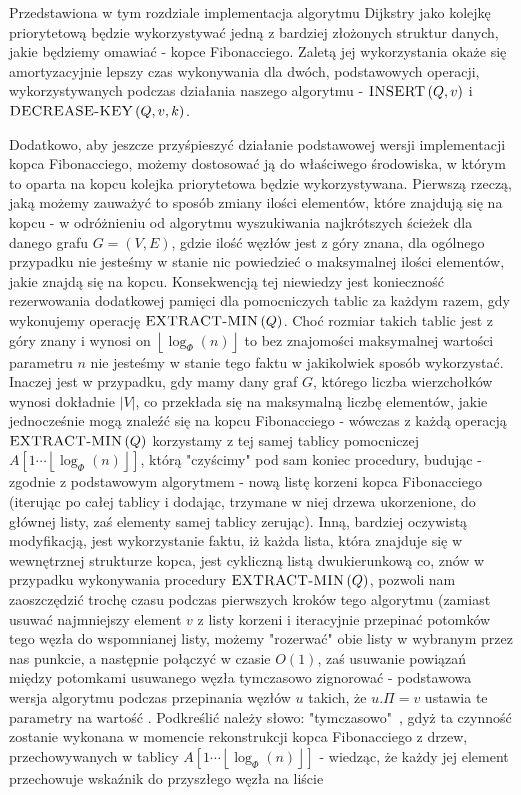 Przedstawiona w tym rozdziale implementacja algorytmu Dijkstry jako kolejkę priorytetową będzie wykorzystywać jedną z bardziej złożonych struktur danych, jakie będziemy omawiać - kopce Fibonacciego. Zaletą jej wykorzystania okaże się amortyzacyjnie lepszy czas wykonywania dla dwóch, podstawowych operacji, wykorzystywanych podczas działania naszego algorytmu - $\textrm{\textsc{INSERT}} \left( Q, v \right)$ i $\textrm{\textsc{DECREASE-KEY}} \left( Q, v, k \right)$.


Dodatkowo, aby jeszcze przyśpieszyć działanie podstawowej wersji implementacji kopca Fibonacciego, możemy dostosować ją do właściwego środowiska, w którym to oparta na kopcu kolejka priorytetowa będzie wykorzystywana. Pierwszą rzeczą, jaką możemy zauważyć to sposób zmiany ilości elementów, które znajdują się na kopcu - w odróżnieniu od algorytmu wyszukiwania najkrótszych ścieżek dla danego grafu $ G = \left( V, E \right)$, gdzie ilość węzłów jest z góry znana, dla ogólnego przypadku nie jesteśmy w stanie nic powiedzieć o maksymalnej ilości elementów, jakie znajdą się na kopcu. Konsekwencją tej niewiedzy jest konieczność rezerwowania dodatkowej pamięci dla pomocniczych tablic za każdym razem, gdy wykonujemy operację $\textrm{\textsc{EXTRACT-MIN}} \left( Q \right)$. Choć rozmiar takich tablic jest z góry znany i wynosi on $ \left \lfloor \log_{\Phi} \left( n \right) \right \rfloor $ to bez znajomości maksymalnej wartości parametru $n$ nie jesteśmy w stanie tego faktu w jakikolwiek sposób wykorzystać. Inaczej jest w przypadku, gdy mamy dany graf $G$, którego liczba wierzchołków wynosi dokładnie $ \left| V \right|$, co przekłada się na maksymalną liczbę elementów, jakie jednocześnie mogą znaleźć się na kopcu Fibonacciego - wówczas z każdą operacją $\textrm{\textsc{EXTRACT-MIN}} \left( Q \right)$ korzystamy z tej samej tablicy pomocniczej $A \left[ 1 \cdots \left \lfloor \log_{\Phi} \left( n \right) \right \rfloor \right]$, którą "czyścimy" pod sam koniec procedury, budując - zgodnie z podstawowym algorytmem - nową listę korzeni kopca Fibonacciego (iterując po całej tablicy i dodając, trzymane w niej drzewa ukorzenione, do głównej listy, zaś elementy samej tablicy zerując). Inną, bardziej oczywistą modyfikacją, jest wykorzystanie faktu, iż każda lista, która znajduje się w wewnętrznej strukturze kopca, jest cykliczną listą dwukierunkową co, znów w przypadku wykonywania procedury $\textrm{\textsc{EXTRACT-MIN}} \left( Q \right)$, pozwoli nam zaoszczędzić trochę czasu podczas pierwszych kroków tego algorytmu (zamiast usuwać najmniejszy element $v$ z listy korzeni i iteracyjnie przepinać potomków tego węzła do wspomnianej listy, możemy "rozerwać" obie listy w wybranym przez nas punkcie, a następnie połączyć w czasie $O \left( 1 \right)$, zaś usuwanie powiązań między potomkami usuwanego węzła tymczasowo zignorować - podstawowa wersja algorytmu podczas przepinania węzłów $u$ takich, że $ u.\Pi = v$ ustawia te parametry na wartość \KwNull. Podkreślić należy słowo: "tymczasowo"~, gdyż ta czynność zostanie wykonana w momencie rekonstrukcji kopca Fibonacciego z drzew, przechowywanych w tablicy $A \left[ 1 \cdots \left \lfloor \log_{\Phi} \left( n \right) \right \rfloor \right]$ - wiedząc, że każdy jej element przechowuje wskaźnik do przyszłego węzła na liście 